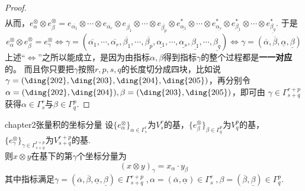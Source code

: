\begin{proof}
\[\begin{split}
	\end{split}
	\]
	从而，$e^{\otimes}_{\alpha}\otimes e^{\otimes}_{\beta}=e_{\overline{\alpha_{ 1 }}}\otimes\cdots\otimes e_{\overline{\alpha_{ r }}}\otimes e_{\overline{\beta_{ 1 }}}\otimes\cdots\otimes e_{\overline{\beta_{ p }}}\otimes e^{\ast}_{\underline{\alpha_{ 1}}}\otimes \cdots \otimes e^{\ast}_{\underline{\alpha_{ s}}}\otimes e^{\ast}_{\underline{\beta_{ 1}}}\otimes\cdots\otimes e^{\ast}_{\underline{\beta_{q}}}$. 于是
	\[
	e^{\otimes}_{\alpha}\otimes e^{\otimes}_{\beta}=e^{\otimes}_{\gamma}
	\Leftrightarrow\gamma=(\overline{\alpha_{ 1 }},\cdots,\overline{\alpha_{ r }},\overline{\beta_{ 1 }},\cdots,\overline{\beta_{ p }},\underline{\alpha_{1}},\cdots,\underline{\alpha_{s}},\underline{\beta_{1}},\cdots,\underline{\beta_{q}})
	\Leftrightarrow\gamma=(\overline{\alpha},\overline{\beta},\underline{\alpha},\underline{\beta})
	\]
	上述“$\Leftrightarrow$”之所以能成立，是因为由指标$\alpha,\beta$得到指标$\gamma$的整个过程都是\textbf{一一对应}的。
	而且你只要把$\gamma$按照$r,p,s,q$的长度切分成四块，比如说$\gamma=(\text{\ding{202}},\text{\ding{203}} ,\text{\ding{204}},\text{\ding{205}})$，再分别令$\alpha=(\text{\ding{202}},\text{\ding{204}}),\beta=(\text{\ding{203}},\text{\ding{205}})$，即可由 $\gamma\in \Gamma^{r+p}_{s+q}$获得$\alpha\in \Gamma^{r}_{s}$与$\beta \in \Gamma^{p}_{q}$.
\end{proof}

\begin{mythm}{}{chapter2张量积的坐标分量}
	设$\{ e^{\otimes}_{\alpha}\}_{\alpha\in \Gamma^{r}_{s}}$为$V^{r}_{s}$的基，$\{ e^{\otimes}_{\beta}\}_{\beta\in \Gamma^{p}_{q}}$为$V^{p}_{q}$的基，$\{ e^{\otimes}_{\gamma}\}_{\gamma\in \Gamma^{r+p}_{s+q}}$为$V^{r+p}_{s+q}$的基.\\
	 则$x\otimes y$在基下的第$\gamma$个坐标分量为
	\[
	(x\otimes y)_{\gamma}=x_{\alpha}\cdot y_{\beta}
	\]
	其中指标满足$\gamma=(\overline{\alpha},\overline{\beta},\underline{\alpha},\underline{\beta})\in \Gamma^{r+p}_{s+q}\;,\alpha=(\overline{\alpha},\underline{\alpha})\in \Gamma^{r}_{s}\;,\beta=(\overline{\beta},\underline{\beta})\in \Gamma^{p}_{q}$.
\end{mythm}


